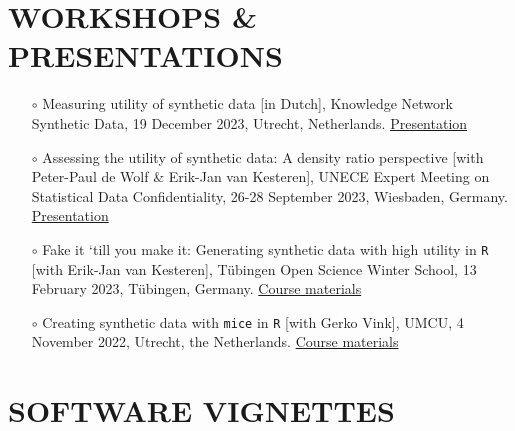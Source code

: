 \documentclass[11pt,a4paper,roman,colorlinks,linkcolor = blue]{moderncv}        %
\begin{document}
\section{WORKSHOPS \& PRESENTATIONS}
\begin{itemize}

\item[$\circ$] Measuring utility of synthetic data [in Dutch], Knowledge Network Synthetic Data, 19 December 2023, Utrecht, Netherlands. \href{https://thomvolker.github.io/utiliteit/}{Presentation}

\item[$\circ$] Assessing the utility of synthetic data: A density ratio perspective [with Peter-Paul de Wolf \& Erik-Jan van Kesteren], UNECE Expert Meeting on Statistical Data Confidentiality, 26-28 September 2023, Wiesbaden, Germany. \href{https://github.com/thomvolker/unece-density-ratio/tree/main/presentation}{Presentation}

\item[$\circ$] Fake it ‘till you make it: Generating synthetic data with high utility in \texttt{R} [with Erik-Jan van Kesteren], T{\"u}bingen Open Science Winter School, 13 February 2023, T{\"u}bingen, Germany. \href{https://thomvolker.github.io/OSWS_Synthetic/}{Course materials}

\item[$\circ$] Creating synthetic data with \texttt{mice} in \texttt{R} [with Gerko Vink], UMCU, 4 November
2022, Utrecht, the Netherlands. \href{https://www.gerkovink.com/syn/}{Course materials}
\end{itemize}

% 


\section{SOFTWARE VIGNETTES}
\end{document}
